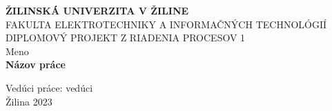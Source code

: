\thispagestyle{empty} %

\begin{center} %
	\begin{Large}
		\textbf{ŽILINSKÁ UNIVERZITA V ŽILINE} \\
		\vspace{0.5cm}
		FAKULTA ELEKTROTECHNIKY
		A INFORMAČNÝCH TECHNOLÓGIÍ \\
		\vspace{5cm}
		DIPLOMOVÝ PROJEKT
		Z RIADENIA PROCESOV 1\\
		\vspace{5cm}
		Meno \\
		\vspace{.5cm}
		\textbf{Názov práce} \\
		\vfill
	\end{Large}

	Vedúci práce: vedúci \\
	Žilina 2023 \\
\end{center}